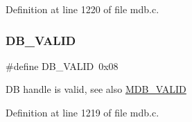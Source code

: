 Definition at line 1220 of file mdb.\+c.

\mbox{\label{group__mt__dbflag_gac774963973e18f60ae646b7295219a8d}} 
\subsubsection{\texorpdfstring{D\+B\+\_\+\+V\+A\+L\+ID}{DB\_VALID}}
{\footnotesize\ttfamily \#define D\+B\+\_\+\+V\+A\+L\+ID~0x08}

DB handle is valid, see also \mbox{\hyperlink{group__internal_gaf63959656ca191ddd4e9e7a119d195e1}{M\+D\+B\+\_\+\+V\+A\+L\+ID}} 

Definition at line 1219 of file mdb.\+c.

